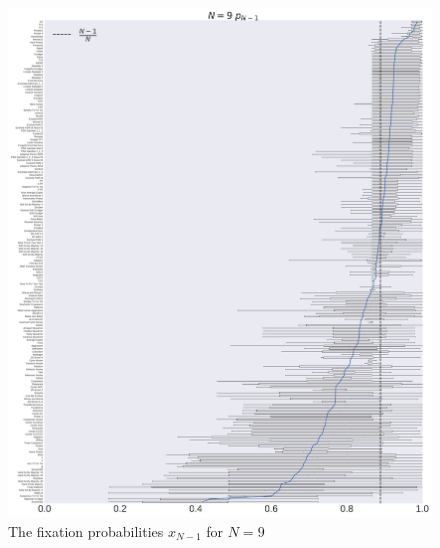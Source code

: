 \documentclass[10pt,letterpaper]{article}
\begin{document}
\begin{figure}[!hbtp]
    \centering
    \includegraphics[width=\textwidth]{./boxplot_9_resist.pdf}
    \caption{The fixation probabilities \(x_{N-1}\) for \(N=9\)}
\end{figure}
\end{document}

